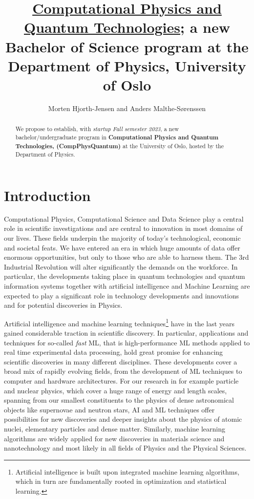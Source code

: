 \documentclass[aps,rmp,preprint,amsmath,amssymb,graphicx,longbibliography]{revtex4-1}
\begin{document}
\title{\underline{Computational Physics and Quantum Technologies}; a new Bachelor of Science program  at the Department of Physics, University of Oslo}

\author{Morten Hjorth-Jensen and Anders Malthe-Sørenssen}


\begin{abstract}
We propose to establish, with {\em startup Fall semester 2023}, a new bachelor/undergraduate program in {\bf Computational Physics and Quantum Technologies, (CompPhysQuantum)}  at the University of Oslo, hosted by the Department of Physics. 
\end{abstract}
\maketitle
\section{Introduction}

Computational Physics, Computational Science  and Data Science play a central role in scientific investigations and are central to innovation in most domains of our lives. These fields underpin the majority of today's technological, economic and societal feats. We have entered an era in which huge amounts of data offer enormous opportunities, but only to those who are able to harness them. The 3rd Industrial Revolution will alter significantly the demands on the workforce. In particular, the developments taking place in quantum technologies and quantum information systems together with artificial intelligence and Machine Learning are expected to play a significant role in technology developments and innovations and for potential discoveries in Physics.

Artificial intelligence and machine learning techniques\footnote{Artificial intelligence is built upon integrated machine learning algorithms, which in turn are fundamentally rooted in optimization and statistical learning.} have in the last years gained considerable traction in scientific discovery. In particular, applications and techniques for so-called {\em fast} ML, that is high-performance ML methods applied to real time experimental data processing, hold great promise for enhancing scientific discoveries in many different disciplines\cite{deiana2021}. 
These developments cover a broad mix of rapidly evolving  fields, from the development of ML techniques to computer and hardware architectures. For our research in for example particle and nuclear physics, which cover a huge range of energy and length scales, spanning from our smallest constituents to the physics of dense astronomical objects like supernovae and neutron stars, AI and ML techniques offer possibilities for new discoveries and deeper insights about the physics of atomic nuclei, elementary particles and dense matter. Similarly, machine learning algorithms are widely applied for new discoveries in materials science and nanotechnology \cite{Schleder2019} and most likely in all fields of Physics and the Physical Sciences.
\end{document}
